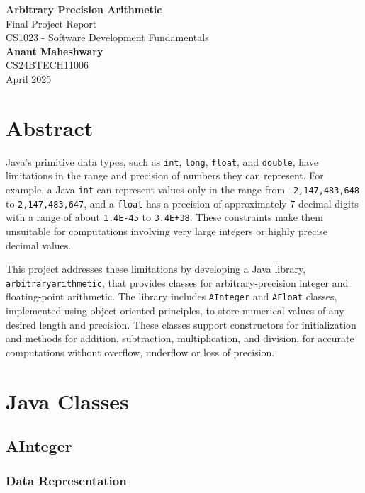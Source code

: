 \documentclass[a4paper,12pt]{article}
\begin{document}
\begin{center}
    {\LARGE \textbf{Arbitrary Precision Arithmetic}}\\[1.5cm]
    {\large Final Project Report}\\
    {\large CS1023 - Software Development Fundamentals}\\[1.5cm]
    {\Large \textbf{Anant Maheshwary}}\\
    CS24BTECH11006\\[1.5cm]
    April 2025
\end{center}

\renewcommand{\contentsname}{Contents}
\tableofcontents
\newpage

\section{Abstract}
Java's primitive data types, such as \texttt{int}, \texttt{long}, \texttt{float}, and \texttt{double}, have limitations in the range and precision of numbers they can represent. For example, a Java \texttt{int} can represent values only in the range from \texttt{-2,147,483,648} to \texttt{2,147,483,647}, and a \texttt{float} has a precision of approximately 7 decimal digits with a range of about \texttt{1.4E-45} to \texttt{3.4E+38}. These constraints make them unsuitable for computations involving very large integers or highly precise decimal values.

This project addresses these limitations by developing a Java library, \texttt{arbitraryarithmetic}, that provides classes for arbitrary-precision integer and floating-point arithmetic. The library includes \texttt{AInteger} and \texttt{AFloat} classes, implemented using object-oriented principles, to store numerical values of any desired length and precision. These classes support constructors for initialization and methods for addition, subtraction, multiplication, and division, for accurate computations without overflow, underflow or loss of precision.

\section{Java Classes}

\subsection{AInteger}

\subsubsection{Data Representation}
\end{document}
